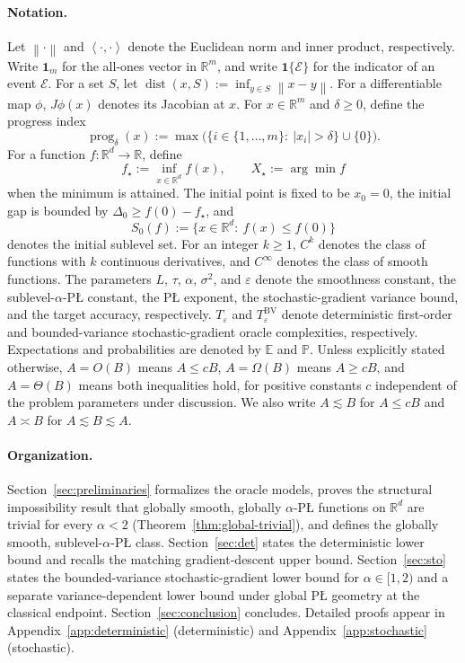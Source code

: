 \documentclass[11pt]{article}
\newcommand{\R}{\mathbb{R}}
\newcommand{\E}{\mathbb{E}}
\newcommand{\Pbb}{\mathbb{P}}
\newcommand{\norm}[1]{\left\lVert #1\right\rVert}
\newcommand{\ip}[2]{\left\langle #1,#2\right\rangle}
\newcommand{\prog}{\operatorname{prog}}
\newcommand{\one}{\mathbf{1}}
\begin{document}
\paragraph{Notation.}
Let \(\norm{\cdot}\) and \(\ip{\cdot}{\cdot}\) denote the Euclidean norm and inner product, respectively. Write \(\one_m\) for
the all-ones vector in \(\R^m\), and write \(\mathbf 1\{\mathcal E\}\) for the indicator of an event \(\mathcal E\).
For a set \(S\), let \(\operatorname{dist}(x,S):=\inf_{y\in S}\norm{x-y}\). For a differentiable map \(\phi\),
\(J\phi(x)\) denotes its Jacobian at \(x\). For \(x\in\R^m\) and \(\delta\ge0\), define the progress index
\[
\prog_\delta(x):=\max\bigl(\{i\in\{1,\ldots,m\}:\ |x_i|>\delta\}\cup\{0\}\bigr).
\]
For a function \(f:\R^d\to\R\), define
\[
f_\star:=\inf_{x\in\R^d}f(x),
\qquad
X_\star:=\arg\min f
\]
when the minimum is attained. The initial point is fixed to be \(x_0=0\), the initial gap is bounded by
\(\Delta_0\ge f(0)-f_\star\), and
\[
S_0(f):=\{x\in\R^d:\ f(x)\le f(0)\}
\]
denotes the initial sublevel set. For an integer \(k\ge 1\), \(C^k\) denotes the class of functions with \(k\)
continuous derivatives, and \(C^\infty\) denotes the class of smooth functions. The parameters \(L\), \(\tau\),
\(\alpha\), \(\sigma^2\), and \(\varepsilon\) denote the smoothness constant, the sublevel-\(\alpha\)-P\L{} constant, the P\L{} exponent, the stochastic-gradient
variance bound, and the target accuracy, 
respectively.  \(T_\varepsilon\) and \(T_\varepsilon^{\mathrm{BV}}\) denote deterministic first-order and
bounded-variance stochastic-gradient oracle complexities, respectively. Expectations and
probabilities are denoted by \(\E\) and \(\Pbb\). Unless explicitly stated otherwise, \(A=O(B)\) means
\(A\le cB\), \(A=\Omega(B)\) means \(A\ge cB\), and \(A=\Theta(B)\) means both inequalities hold, for positive
constants \(c\) independent of the problem parameters under discussion. We also write \(A\lesssim B\) for
\(A\le cB\) and \(A\asymp B\) for \(A\lesssim B\lesssim A\).

\paragraph{Organization.}
Section~\ref{sec:preliminaries} formalizes the oracle models, proves the structural impossibility result that
globally smooth, globally $\alpha$-P\L{} functions on $\R^d$ are trivial for every $\alpha<2$
(Theorem~\ref{thm:global-trivial}), and defines the globally smooth, sublevel-$\alpha$-P\L{} class.
Section~\ref{sec:det} states the deterministic lower bound and recalls the matching gradient-descent upper bound.
Section~\ref{sec:sto} states the bounded-variance stochastic-gradient lower bound for
$\alpha\in[1,2)$ and a separate variance-dependent lower bound under global P\L{} geometry at the classical endpoint.
Section~\ref{sec:conclusion}
concludes. Detailed proofs appear in Appendix~\ref{app:deterministic} (deterministic) and
Appendix~\ref{app:stochastic} (stochastic).
\end{document}
